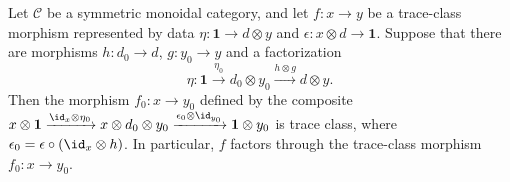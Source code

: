 \documentclass[a4paper,10pt, oneside]{amsart}
\begin{document}
		\begin{prop}\label{traceclassfactorization}
		Let $\mathcal{C}$ be a symmetric monoidal category, and let
		$
		f:x\to y
		$
		be a trace-class morphism represented by  data
		$
		\eta:\mathbf{1}\to d\otimes y$ and $
		\epsilon:x\otimes d\to \mathbf{1}.
		$
		Suppose that there are morphisms $h:d_0\to d$, $g:y_0\to y$ and a factorization
		\[
		\eta:
		\mathbf{1}
		\xrightarrow{\eta_0}
		d_0\otimes y_0
		\xrightarrow{h\otimes g}
		d\otimes y.
		\]
		Then the morphism
		$
		f_0:x\to y_0
		$
		defined by the composite
		$
		x\otimes\mathbf{1}
		\xrightarrow{\id_x\otimes\eta_0}
		x\otimes d_0\otimes y_0
		\xrightarrow{\epsilon_0\otimes\id_{y_0}}
		\mathbf{1}\otimes y_0
		$
		is trace class, where $\epsilon_0=\epsilon\circ (\id_x\otimes h)$.
		In particular, $f$ factors through the trace-class morphism $f_0:x\to y_0$.
		
	\end{prop}
	
\end{document}
